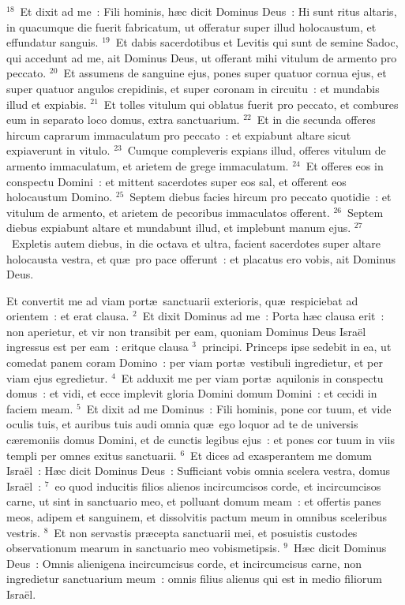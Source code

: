 ${}^{18}$~Et dixit ad me~: Fili hominis, h\ae c dicit Dominus Deus~: Hi sunt ritus altaris, in quacumque die fuerit fabricatum, ut offeratur super illud holocaustum, et effundatur sanguis.
${}^{19}$~Et dabis sacerdotibus et Levitis qui sunt de semine Sadoc, qui accedunt ad me, ait Dominus Deus, ut offerant mihi vitulum de armento pro peccato.
${}^{20}$~Et assumens de sanguine ejus, pones super quatuor cornua ejus, et super quatuor angulos crepidinis, et super coronam in circuitu~: et mundabis illud et expiabis.
${}^{21}$~Et tolles vitulum qui oblatus fuerit pro peccato, et combures eum in separato loco domus, extra sanctuarium.
${}^{22}$~Et in die secunda offeres hircum caprarum immaculatum pro peccato~: et expiabunt altare sicut expiaverunt in vitulo.
${}^{23}$~Cumque compleveris expians illud, offeres vitulum de armento immaculatum, et arietem de grege immaculatum.
${}^{24}$~Et offeres eos in conspectu Domini~: et mittent sacerdotes super eos sal, et offerent eos holocaustum Domino.
${}^{25}$~Septem diebus facies hircum pro peccato quotidie~: et vitulum de armento, et arietem de pecoribus immaculatos offerent.
${}^{26}$~Septem diebus expiabunt altare et mundabunt illud, et implebunt manum ejus.
${}^{27}$~Expletis autem diebus, in die octava et ultra, facient sacerdotes super altare holocausta vestra, et qu\ae\ pro pace offerunt~: et placatus ero vobis, ait Dominus Deus.

\lettrine[lines=10,image=true,loversize=0.05,lraise=-0.03]{E}{}t convertit me ad viam port\ae\ sanctuarii exterioris, qu\ae\ respiciebat ad orientem~: et erat clausa.
${}^{2}$~Et dixit Dominus ad me~: Porta h\ae c clausa erit~: non aperietur, et vir non transibit per eam, quoniam Dominus Deus Isra\"el ingressus est per eam~: eritque clausa
${}^{3}$~principi. Princeps ipse sedebit in ea, ut comedat panem coram Domino~: per viam port\ae\ vestibuli ingredietur, et per viam ejus egredietur.
${}^{4}$~Et adduxit me per viam port\ae\ aquilonis in conspectu domus~: et vidi, et ecce implevit gloria Domini domum Domini~: et cecidi in faciem meam.
${}^{5}$~Et dixit ad me Dominus~: Fili hominis, pone cor tuum, et vide oculis tuis, et auribus tuis audi omnia qu\ae\ ego loquor ad te de universis c\ae remoniis domus Domini, et de cunctis legibus ejus~: et pones cor tuum in viis templi per omnes exitus sanctuarii.
${}^{6}$~Et dices ad exasperantem me domum Isra\"el~: H\ae c dicit Dominus Deus~: Sufficiant vobis omnia scelera vestra, domus Isra\"el~:
${}^{7}$~eo quod inducitis filios alienos incircumcisos corde, et incircumcisos carne, ut sint in sanctuario meo, et polluant domum meam~: et offertis panes meos, adipem et sanguinem, et dissolvitis pactum meum in omnibus sceleribus vestris.
${}^{8}$~Et non servastis pr\ae cepta sanctuarii mei, et posuistis custodes observationum mearum in sanctuario meo vobismetipsis.
${}^{9}$~H\ae c dicit Dominus Deus~: Omnis alienigena incircumcisus corde, et incircumcisus carne, non ingredietur sanctuarium meum~: omnis filius alienus qui est in medio filiorum Isra\"el.


